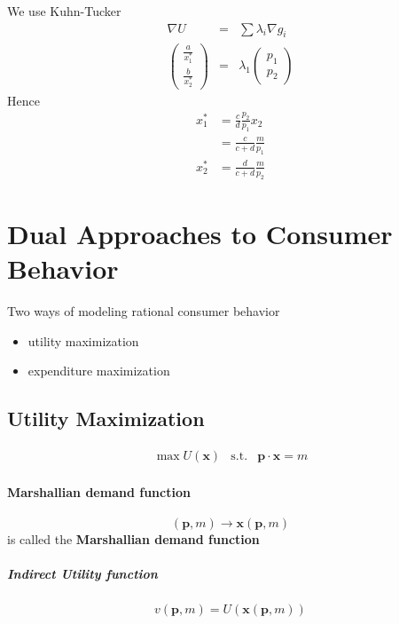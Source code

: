 \documentclass[a4paper] {scrartcl}
\begin{document}
We use Kuhn-Tucker
\begin{eqnarray}
	\nabla U &=& \sum \lambda_i\nabla g_i\\
	\begin{pmatrix}
		\frac{a}{x_1^*}\\\frac{b}{x_2^*} 
	\end{pmatrix}
	&=& \lambda_1 
	\begin{pmatrix}
		p_1\\p_2
	\end{pmatrix}
\end{eqnarray}
Hence
\begin{eqnarray}
	x_1^* &= \frac{c}{d}\frac{p_2}{p_1}x_2\\
	&= \frac{c}{c+d}\frac{m}{p_1}\\
	x_2^*&= \frac{d}{c+d}\frac{m}{p_2}
\end{eqnarray}


\section{Dual Approaches to Consumer Behavior}

Two ways of modeling rational consumer behavior
\begin{itemize}
	\item utility maximization
	\item expenditure maximization
\end{itemize}

\subsection{Utility Maximization}
\begin{eqnarray}
	\max U( \mathbf{x}) &\text{s.t.}& \mathbf{p}\cdot \mathbf{x}= m
\end{eqnarray}

\paragraph{Marshallian demand function} %
\label{par:marshallian_demand_function}
\begin{equation}
	(\mathbf{p}, m)\rightarrow \mathbf{x}(\mathbf{p}, m)
\end{equation}
is called the \textbf{Marshallian demand function}

\subparagraph{Indirect Utility function} %
\label{par:indirect_utility_function}
\begin{equation}
	v(\mathbf{p}, m) = U(\mathbf{x}(\mathbf{p}, m))
\end{equation}
\end{document}
